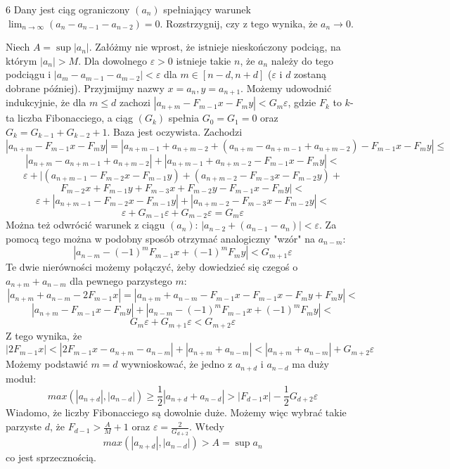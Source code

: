 \documentclass{../note}
\begin{document}
\begin{zadanie}{6}
Dany jest ciąg ograniczony $(a_{n})$ spełniający warunek $ \lim_{n\rightarrow\infty}(a_{n}-a_{n-1}-a_{n-2})=0 $. Rozstrzygnij, czy z tego wynika, że $a_{n}\rightarrow 0$.
\end{zadanie}
\begin{rozwiazanie}
Niech $A = \sup |a_n|$. Załóżmy nie wprost, że istnieje nieskończony podciąg, na którym $|a_n| > M$. Dla dowolnego $\varepsilon > 0$ istnieje takie $n$, że $a_n$ należy do tego podciągu i $|a_{m}-a_{m-1}-a_{m-2}| < \varepsilon$ dla $m \in [n - d, n + d]$ ($\varepsilon$ i $d$ zostaną dobrane później). Przyjmijmy nazwy $x = a_n, y = a_{n+1}$. Możemy udowodnić indukcyjnie, że dla $m \leq d$ zachozi 
$|a_{n+m} - F_{m-1}x - F_my| < G_m\varepsilon$, gdzie $F_k$ to $k$-ta liczba Fibonacciego, a ciąg $(G_k)$ spełnia $G_0 = G_1 = 0$ oraz $G_k = G_{k-1} + G_{k-2} + 1$. Baza jest oczywista. Zachodzi 
\[|a_{n+m} - F_{m-1}x - F_my| = |a_{n+m-1} + a_{n+m-2} + (a_{n+m} - a_{n+m-1} + a_{n+m-2}) - F_{m-1}x - F_my| \leq\]
\[|a_{n+m} - a_{n+m-1} + a_{n+m-2}| + |a_{n+m-1} + a_{n+m-2} - F_{m-1}x - F_my| <\]
\[\varepsilon + |(a_{n+m-1} - F_{m-2}x - F_{m-1}y) + (a_{n+m-2} - F_{m-3}x - F_{m-2}y) + \]\[F_{m-2}x + F_{m-1}y + F_{m-3}x + F_{m-2}y - F_{m-1}x - F_my| <\]
\[\varepsilon + |a_{n+m-1} - F_{m-2}x - F_{m-1}y| + |a_{n+m-2} - F_{m-3}x - F_{m-2}y| <\]
\[\varepsilon + G_{m-1}\varepsilon + G_{m-2}\varepsilon = G_m\varepsilon\]
Można też odwrócić warunek z ciągu $(a_n)$: $|a_{n-2} + (a_{n-1} - a_n)| < \varepsilon$. Za pomocą tego można w podobny sposób otrzymać analogiczny "wzór" na $a_{n-m}$: 
\[|a_{n-m} - (-1)^mF_{m-1}x + (-1)^mF_my| < G_{m+1}\varepsilon\]
Te dwie nierówności możemy połączyć, żeby dowiedzieć się czegoś o $a_{n+m} + a_{n-m}$ dla pewnego parzystego $m$:
\[|a_{n+m} + a_{n-m} - 2F_{m-1}x| = |a_{n+m} + a_{n-m} - F_{m-1}x - F_{m-1}x - F_my + F_my| <\]
\[|a_{n+m} - F_{m-1}x - F_my| + |a_{n-m} - (-1)^mF_{m-1}x + (-1)^mF_my| <\]
\[G_m\varepsilon + G_{m+1}\varepsilon < G_{m+2}\varepsilon\]
Z tego wynika, że
\[|2F_{m-1}x| < |2F_{m-1}x - a_{n+m} - a_{n-m}| + |a_{n+m} + a_{n-m}| < |a_{n+m} + a_{n-m}| + G_{m+2}\varepsilon\]
Możemy podstawić $m = d$ wywnioskować, że jedno z $a_{n+d}$ i $a_{n-d}$ ma duży moduł:
\[max(|a_{n+d}|, |a_{n-d}|) \geq \frac12|a_{n+d} + a_{n-d}| > |F_{d-1}x| - \frac12G_{d+2}\varepsilon\]
Wiadomo, że liczby Fibonacciego są dowolnie duże. Możemy więc wybrać takie parzyste $d$, że $F_{d-1} > \frac{A}{M} + 1$ oraz $\varepsilon = \frac{2}{G_{d+2}}$. Wtedy 
\[max(|a_{n+d}|, |a_{n-d}|) > A = \sup a_n\]
co jest sprzecznością.
\end{rozwiazanie}
\end{document}
